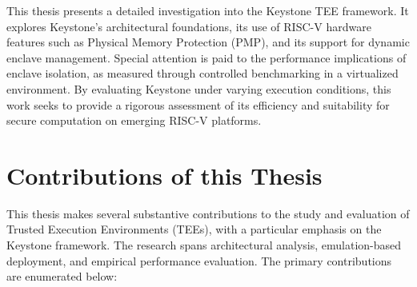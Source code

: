 This thesis presents a detailed investigation into the Keystone TEE framework. It explores Keystone's architectural foundations, its use of RISC-V hardware features such as Physical Memory Protection (PMP), and its support for dynamic enclave management. Special attention is paid to the performance implications of enclave isolation, as measured through controlled benchmarking in a virtualized environment. By evaluating Keystone under varying execution conditions, this work seeks to provide a rigorous assessment of its efficiency and suitability for secure computation on emerging RISC-V platforms.


\section{Contributions of this Thesis}
This thesis makes several substantive contributions to the study and evaluation of Trusted Execution Environments (TEEs), with a particular emphasis on the Keystone framework. The research spans architectural analysis, emulation-based deployment, and empirical performance evaluation. The primary contributions are enumerated below:

